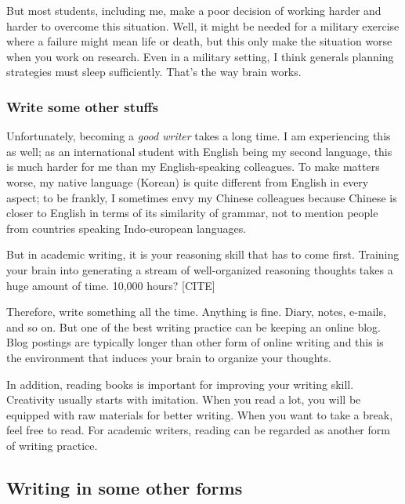 \documentclass[11pt]{article}
\begin{document}
But most students, including me, make a poor decision of working harder and
harder to overcome this situation. Well, it might be needed for a military
exercise where a failure might mean life or death, but this only make the
situation worse when you work on research. Even in a military setting, I think
generals planning strategies must sleep sufficiently. That's the way brain
works. 


\subsubsection{Write some other stuffs}


Unfortunately, becoming a \emph{good writer} takes a long time. I am
experiencing this as well; as an international student with English being my
second language, this is much harder for me than my English-speaking
colleagues.  To make matters worse, my native language (Korean) is quite
different from English in every aspect; to be frankly, I sometimes envy my
Chinese colleagues because Chinese is closer to English in terms of its
similarity of grammar, not to mention people from countries speaking
Indo-european languages.

But in academic writing, it is your reasoning skill that has to come first.
Training your brain into generating a stream of well-organized reasoning
thoughts takes a huge amount of time. 10,000 hours? [CITE]

Therefore, write something all the time. Anything is fine. Diary, notes,
e-mails, and so on. But one of the best writing practice can be keeping an
online blog. Blog postings are typically longer than other form of online
writing and this is the environment that induces your brain to organize your
thoughts. 

In addition, reading books is important for improving your writing skill.
Creativity usually starts with imitation. When you read a lot, you will be
equipped with raw materials for better writing.  When you want to take a
break, feel free to read. For academic writers, reading can be regarded as
another form of writing practice.

\subsection{Writing in some other forms}
\end{document}

